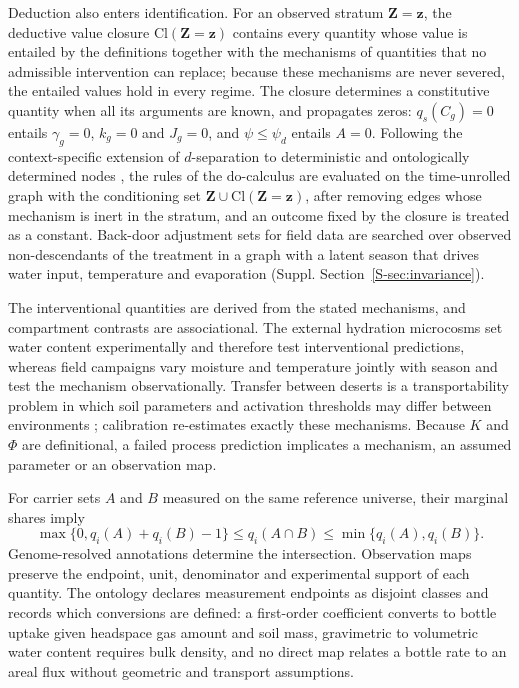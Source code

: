 \documentclass[11pt,a4paper]{article}
\begin{document}
Deduction also enters identification. For an observed stratum $\mathbf{Z}=\mathbf{z}$, the deductive value closure $\mathrm{Cl}(\mathbf{Z}=\mathbf{z})$ contains every quantity whose value is entailed by the definitions together with the mechanisms of quantities that no admissible intervention can replace; because these mechanisms are never severed, the entailed values hold in every regime. The closure determines a constitutive quantity when all its arguments are known, and propagates zeros: $q_s(C_g)=0$ entails $\gamma_g=0$, $k_g=0$ and $J_g=0$, and $\psi\leq\psi_d$ entails $A=0$. Following the context-specific extension of $d$-separation to deterministic and ontologically determined nodes \cite{geiger1990identifying}, the rules of the $\mathrm{do}$-calculus are evaluated on the time-unrolled graph with the conditioning set $\mathbf{Z}\cup\mathrm{Cl}(\mathbf{Z}=\mathbf{z})$, after removing edges whose mechanism is inert in the stratum, and an outcome fixed by the closure is treated as a constant. Back-door adjustment sets for field data are searched over observed non-descendants of the treatment in a graph with a latent season that drives water input, temperature and evaporation (Suppl. Section~\ref{S-sec:invariance}).

The interventional quantities are derived from the stated mechanisms, and compartment contrasts are associational. The external hydration microcosms set water content experimentally and therefore test interventional predictions, whereas field campaigns vary moisture and temperature jointly with season and test the mechanism observationally. Transfer between deserts is a transportability problem in which soil parameters and activation thresholds may differ between environments \cite{pearl2014external}; calibration re-estimates exactly these mechanisms. Because $K$ and $\Phi$ are definitional, a failed process prediction implicates a mechanism, an assumed parameter or an observation map.

For carrier sets $A$ and $B$ measured on the same reference universe, their marginal shares imply
\begin{equation}
\max\{0,q_i(A)+q_i(B)-1\}\leq q_i(A\cap B)\leq\min\{q_i(A),q_i(B)\}.
\end{equation}
Genome-resolved annotations determine the intersection. Observation maps preserve the endpoint, unit, denominator and experimental support of each quantity. The ontology declares measurement endpoints as disjoint classes and records which conversions are defined: a first-order coefficient converts to bottle uptake given headspace gas amount and soil mass, gravimetric to volumetric water content requires bulk density, and no direct map relates a bottle rate to an areal flux without geometric and transport assumptions.
\end{document}
